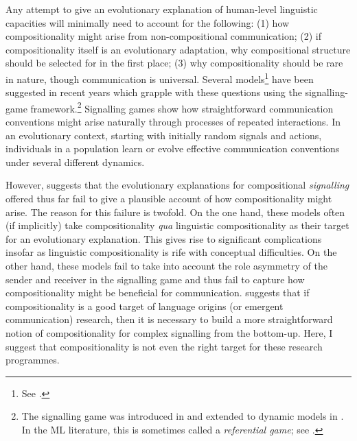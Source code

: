 \documentclass{article}
\begin{document}
Any attempt to give an evolutionary explanation of human-level linguistic capacities will minimally need to account for the following: (1) how compositionality might arise from non-compositional communication; (2) if compositionality itself is an evolutionary adaptation, why compositional structure should be selected for in the first place; (3) why compositionality should be rare in nature, though communication is universal. %
%
Several models\footnote{See \citet{Nowak-Krakauer-1999, Barrett-2006, Barrett-2007, Barrett-2009, Franke-2014, Franke-2016, Steinert-Threlkeld-2014, Steinert-Threlkeld-2016, Steinert-Threlkeld-2018, Barrett-et-al-2018}.} have been suggested in recent years which grapple with these questions using the signalling-game framework.\footnote{The signalling game was introduced in \citet{Lewis-1969} and extended to dynamic models in \citet{Skyrms-1996, Skyrms-2010-Signals}. In the ML literature, this is sometimes called a {\it referential game}; see \citet{Lazaridou-et-al-2016, Das-et-al-2017, Evtimova-et-al-2017, Havrylov-Titov-2017, Kottur-et-al-2017, Choi-et-al-2018, Lazaridou-et-al-2018}.} Signalling games show how straightforward communication conventions might arise naturally through processes of repeated interactions. In an evolutionary context, starting with initially random signals and actions, individuals in a population learn or evolve effective communication conventions under several different dynamics. 

However, \citet{LaCroix-2019-Compositionality} suggests that the evolutionary explanations for compositional {\it signalling} offered thus far fail to give a plausible account of how compositionality might arise. The reason for this failure is twofold. On the one hand, these models often (if implicitly) take compositionality {\it qua} linguistic compositionality as their target for an evolutionary explanation. This gives rise to significant complications insofar as linguistic compositionality is rife with conceptual difficulties. On the other hand, these models fail to take into account the role asymmetry of the sender and receiver in the signalling game and thus fail to capture how compositionality might be beneficial for communication. \citet{LaCroix-2019-Compositionality} suggests that if compositionality is a good target of language origins (or emergent communication) research, then it is necessary to build a more straightforward notion of  compositionality for complex signalling from the bottom-up. Here, I suggest that compositionality is not even the right target for these research programmes. 
\end{document}
